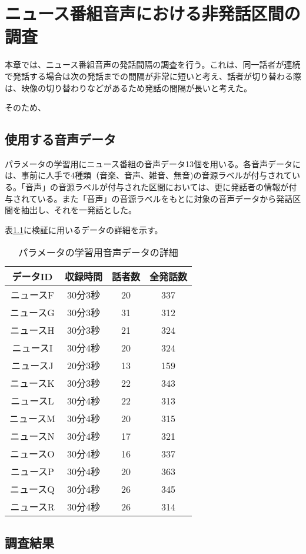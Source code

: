 \chapter{ニュース番組音声における非発話区間の調査}
本章では、ニュース番組音声の発話間隔の調査を行う。これは、同一話者が連続で発話する場合は次の発話までの間隔が非常に短いと考え、話者が切り替わる際は、映像の切り替わりなどがあるため発話の間隔が長いと考えた。\par
そのため、

\section{使用する音声データ}
パラメータの学習用にニュース番組の音声データ13個を用いる。各音声データには、事前に人手で4種類（音楽、音声、雑音、無音)の音源ラベルが付与されている。「音声」の音源ラベルが付与された区間においては、更に発話者の情報が付与されている。また「音声」の音源ラベルをもとに対象の音声データから発話区間を抽出し、それを一発話とした。\par
表\ref{table:train_detail}に検証に用いるデータの詳細を示す。\vspace{0.2in}

\begin{table}[htb]
  \begin{center}
  \label{table:train_detail}
    \caption{パラメータの学習用音声データの詳細}
    \begin{tabular}{|c||c|c|c|} \hline
      データID & 収録時間 & 話者数 & 全発話数 \\ \hline
      ニュースF & 30分3秒 & 20 & 337 \\ \hline
      ニュースG & 30分3秒 & 31 & 312\\ \hline
      ニュースH & 30分3秒 & 21 & 324 \\ \hline
      ニュースI & 30分4秒 & 20 & 324\\ \hline
      ニュースJ & 20分3秒 & 13 & 159\\ \hline
      ニュースK & 30分3秒 & 22 & 343\\ \hline
      ニュースL & 30分4秒 & 22 & 313\\ \hline
      ニュースM & 30分4秒 & 20 & 315\\ \hline
      ニュースN & 30分4秒 & 17 & 321\\ \hline
      ニュースO & 30分4秒 & 16 & 337\\ \hline
      ニュースP & 30分4秒 & 20 & 363\\ \hline
      ニュースQ & 30分4秒 & 26 & 345\\ \hline
      ニュースR & 30分4秒 & 26 & 314\\ \hline
    \end{tabular}
  \end{center}
\end{table}
\section{調査結果}
